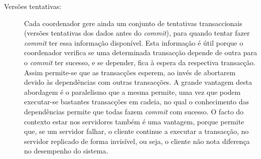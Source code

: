 \begin{description}
\item[Versões tentativas:]
Cada coordenador gere ainda um conjunto de tentativas transaccionais (versões tentativas dos dados antes do \textit{commit}), para quando tentar fazer \textit{commit} ter essa informação disponível. Esta informação é útil porque o coordenador verifica se uma determinada transacção depende de outra para o \textit{commit} ter sucesso, e se depender, fica à espera da respectiva transacção. Assim permite-se que as transacções esperem, ao invés de abortarem devido às dependências com outras transacções. A grande vantagem desta abordagem é o paralelismo que a mesma permite, uma vez que podem executar-se bastantes transacções em cadeia, no qual o conhecimento das dependências permite que todas fazem \textit{commit} com sucesso. O facto do contexto estar nos servidores também é uma vantagem, porque permite que, se um servidor falhar, o cliente continue a executar a transacção, no servidor replicado de forma invisível, ou seja, o cliente não nota diferença no desempenho do sistema. 

\end{description}